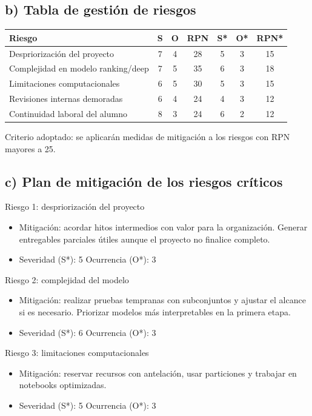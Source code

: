 \documentclass[
11pt, %
]{charter}
\begin{document}
\subsection*{b) Tabla de gestión de riesgos}

\begin{table}[htpb]
\centering
\begin{tabularx}{\linewidth}{@{}|X|c|c|c|c|c|c|@{}}
\hline
\rowcolor[HTML]{C0C0C0}
Riesgo & S & O & RPN & S* & O* & RPN* \\ \hline
Despriorización del proyecto & 7 & 4 & 28 & 5 & 3 & 15 \\ \hline
Complejidad en modelo ranking/deep & 7 & 5 & 35 & 6 & 3 & 18 \\ \hline
Limitaciones computacionales & 6 & 5 & 30 & 5 & 3 & 15 \\ \hline
Revisiones internas demoradas & 6 & 4 & 24 & 4 & 3 & 12 \\ \hline
Continuidad laboral del alumno & 8 & 3 & 24 & 6 & 2 & 12 \\ \hline
\end{tabularx}
\end{table}

Criterio adoptado: se aplicarán medidas de mitigación a los riesgos con RPN mayores a 25.

\subsection*{c) Plan de mitigación de los riesgos críticos}

Riesgo 1: despriorización del proyecto
\begin{itemize}
  \item Mitigación: acordar hitos intermedios con valor para la organización. Generar entregables parciales útiles aunque el proyecto no finalice completo.
  \item Severidad (S*): 5 \quad Ocurrencia (O*): 3
\end{itemize}

Riesgo 2: complejidad del modelo
\begin{itemize}
  \item Mitigación: realizar pruebas tempranas con subconjuntos y ajustar el alcance si es necesario. Priorizar modelos más interpretables en la primera etapa.
  \item Severidad (S*): 6 \quad Ocurrencia (O*): 3
\end{itemize}

Riesgo 3: limitaciones computacionales
\begin{itemize}
  \item Mitigación: reservar recursos con antelación, usar particiones y trabajar en notebooks optimizadas.
  \item Severidad (S*): 5 \quad Ocurrencia (O*): 3
\end{itemize}
\end{document}

